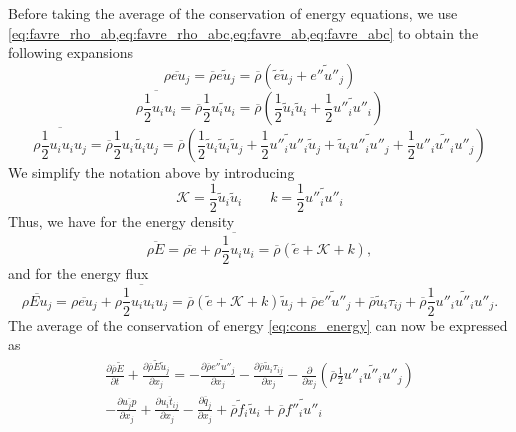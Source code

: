 \documentclass[oneside,a4paper,11pt]{report}
\newcommand{\rhoavg}{\overline{\rho}}
\newcommand{\qavg}{\overline{q}}
\newcommand{\rs}{\tau}          %
\newcommand{\eavgf}{\widetilde{e}}
\newcommand{\favgf}{\widetilde{f}}
\newcommand{\uavgf}{\widetilde{u}}
\newcommand{\Eavgf}{\widetilde{E}}
\newcommand{\eflucf}{e''}
\newcommand{\fflucf}{f''}
\newcommand{\uflucf}{u''}
\begin{document}
Before taking the average of the conservation of energy equations, we use \cref{eq:favre_rho_ab,eq:favre_rho_abc,eq:favre_ab,eq:favre_abc} to obtain the following expansions
\begin{equation}
\label{eq:intener_flux_exansion}
    \overline{ \rho e u_j } = \rhoavg \widetilde{e u_j} = \rhoavg \left ( \eavgf \uavgf_j + \widetilde{\eflucf \uflucf_j} \right)
\end{equation}
\begin{equation}
\label{eq:tke_expansion}
    \overline{ \rho \frac{1}{2} u_i u_i } = \rhoavg \frac{1}{2} \widetilde{u_i u_i} = \rhoavg \left ( \frac{1}{2} \uavgf_i \uavgf_i +  \frac{1}{2} \widetilde{\uflucf_i \uflucf_i} \right)
\end{equation}
\begin{equation}
\label{eq:tke_flux_expansion}
    \overline{ \rho \frac{1}{2} u_i u_i u_j } = \rhoavg \frac{1}{2} \widetilde{u_i u_i u_j} = \rhoavg \left ( \frac{1}{2} \uavgf_i \uavgf_i \uavgf_j + \frac{1}{2} \widetilde{\uflucf_i \uflucf_i} \uavgf_j + \uavgf_i \widetilde{\uflucf_i \uflucf_j} +  \frac{1}{2} \widetilde{\uflucf_i \uflucf_i \uflucf_j} \right)
\end{equation}
We simplify the notation above by introducing
\begin{equation}
    \label{eq:kinetic_energies}
    \mathcal{K} = \frac{1}{2} \uavgf_i \uavgf_i \qquad k = \frac{1}{2} \widetilde{\uflucf_i \uflucf_i}
\end{equation}
Thus, we have for the energy density
\begin{equation}
    \overline{ \rho E } = \overline{ \rho e } + \overline{ \rho \frac{1}{2} u_i u_i } = \rhoavg \left ( \eavgf +  \mathcal{K} + k \right ),
\end{equation}
and for the energy flux
\begin{equation}
    \overline{ \rho E u_j } = \overline{ \rho e u_j } + \overline{ \rho \frac{1}{2} u_i u_i u_j } = \rhoavg \left(\eavgf + \mathcal{K} + k \right) \uavgf_j + \rhoavg \widetilde{\eflucf \uflucf_j} + \rhoavg \uavgf_i \rs_{ij} + \rhoavg \frac{1}{2} \widetilde{\uflucf_i \uflucf_i \uflucf_j} .
\end{equation}
The average of the conservation of energy \cref{eq:cons_energy} can now be expressed as
\begin{multline}
\label{eq:favre_energy_intermediate}
\frac{\partial \rhoavg \Eavgf}{\partial t} + \frac{\partial \rhoavg \Eavgf \uavgf_j }{\partial x_j} = -\frac{\partial \rhoavg \widetilde{ \eflucf u''_j } }{\partial x_j} - \frac{\partial \rhoavg \uavgf_i \rs_{ij} }{\partial x_j} - \frac{ \partial }{ \partial x_j } \left ( \rhoavg \frac{1}{2} \widetilde{ \uflucf_i \uflucf_i \uflucf_j } \right ) \\
- \frac{ \partial \overline{ u_j p } }{\partial x_j} + \frac{ \partial \overline{ u_i t_{ij} } }{\partial x_j} - \frac{\partial \qavg_j }{\partial x_j} + \rhoavg \favgf_i \uavgf_i + \rhoavg \widetilde{ \fflucf_i \uflucf_i }
\end{multline}
\end{document}
